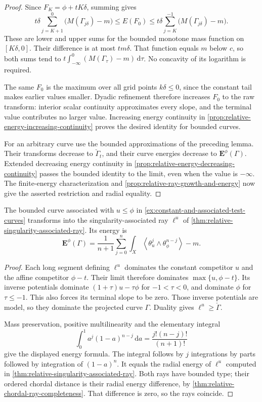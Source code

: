 \begin{proof}
Since $F_K=\phi+tK\delta$, summing gives
\[
 t\delta\sum_{j=K+1}^0\bigl(M(\Gamma_{j\delta})-m\bigr)
       \leq E(F_0)
       \leq t\delta\sum_{j=K}^{-1}\bigl(M(\Gamma_{j\delta})-m\bigr).
\]
These are lower and upper sums for the bounded monotone mass function on $[K\delta,0]$. Their difference is at most $tm\delta$. That function equals $m$ below $c$, so both sums tend to $t\int_{-\infty}^0(M(\Gamma_\tau)-m)\,\mathrm d\tau$. No concavity of its logarithm is required.

The same $F_0$ is the maximum over all grid points $k\delta\leq0$, since the constant tail makes earlier values smaller. Dyadic refinement therefore increases $F_0$ to the raw transform: interior scalar continuity approximates every slope, and the terminal value contributes no larger value. Increasing energy continuity in \cref{prop:relative-energy-increasing-continuity} proves the desired identity for bounded curves.

For an arbitrary curve use the bounded approximations of the preceding lemma. Their transforms decrease to $\check\Gamma_t$, and their curve energies decrease to $\mathbf E^\phi(\Gamma)$. Extended decreasing energy continuity in \cref{prop:relative-energy-decreasing-continuity} passes the bounded identity to the limit, even when the value is $-\infty$. The finite-energy characterization and \cref{prop:relative-ray-growth-and-energy} now give the asserted restriction and radial equality.
\end{proof}

\begin{corollary}\label{cor:associated-test-curve-ray}
The bounded curve associated with $u\leq\phi$ in \cref{ex:constant-and-associated-test-curves} transforms into the singularity-associated ray $\ell^u$ of \cref{thm:relative-singularity-associated-ray}. Its energy is
\[
 \mathbf E^\phi(\Gamma)
 =\frac1{n+1}\sum_{j=0}^n
       \int_X\left\langle\theta_u^j\wedge\theta_\phi^{n-j}\right\rangle-m.
\]
\end{corollary}
\begin{proof}
Each long segment defining $\ell^u$ dominates the constant competitor $u$ and the affine competitor $\phi-t$. Their limit therefore dominates $\max\{u,\phi-t\}$. Its inverse potentials dominate $(1+\tau)u-\tau\phi$ for $-1<\tau<0$, and dominate $\phi$ for $\tau\leq-1$. This also forces its terminal slope to be zero. Those inverse potentials are model, so they dominate the projected curve $\Gamma$. Duality gives $\ell^u\geq\check\Gamma$.

Mass preservation, positive multilinearity and the elementary integral
\[
 \int_0^1 a^j(1-a)^{n-j}\,\mathrm da
                      =\frac{j!(n-j)!}{(n+1)!}
\]
give the displayed energy formula. The integral follows by $j$ integrations by parts followed by integration of $(1-a)^n$. It equals the radial energy of $\ell^u$ computed in \cref{thm:relative-singularity-associated-ray}. Both rays have bounded type; their ordered chordal distance is their radial energy difference, by \cref{thm:relative-chordal-ray-completeness}. That difference is zero, so the rays coincide.
\end{proof}


